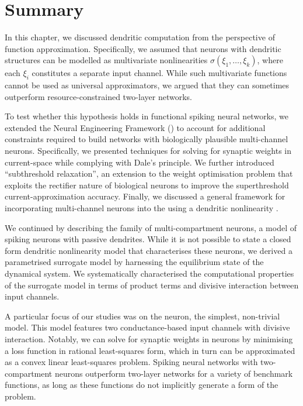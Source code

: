 
\section{Summary}
\label{sec:nlif_discussion}

In this chapter, we discussed dendritic computation from the perspective of function approximation.
Specifically, we assumed that neurons with dendritic structures can be modelled as multivariate nonlinearities $\sigma(\xi_1, \ldots, \xi_k)$, where each $\xi_i$ constitutes a separate input channel.
While such multivariate functions cannot be used as universal approximators, we argued that they can sometimes outperform resource-constrained two-layer networks.

To test whether this hypothesis holds in functional spiking neural networks, we extended the Neural Engineering Framework (\NEF) to account for additional constraints required to build networks with biologically plausible multi-channel neurons.
Specifically, we presented techniques for solving for synaptic weights in current-space while complying with Dale's principle.
We further introduced \enquote{subthreshold relaxation}, an extension to the weight optimisation problem that exploits the rectifier nature of biological neurons to improve the superthreshold current-approximation accuracy.
Finally, we discussed a general framework for incorporating multi-channel neurons into the \NEF using a dendritic nonlinearity \Hden.

We continued by describing the \nlif family of multi-compartment neurons, a model of spiking neurons with passive dendrites.
While it is not possible to state a closed form dendritic nonlinearity model \Hden that characterises these neurons, we derived a parametrised surrogate model by harnessing the equilibrium state of the \nlif dynamical system.
We systematically characterised the computational properties of the surrogate model in terms of product terms and divisive interaction between input channels.

A particular focus of our studies was on the \twocomplif neuron, the simplest, non-trivial \nlif model.
This model features two conductance-based input channels with divisive interaction.
Notably, we can solve for synaptic weights in \twocomplif neurons by minimising a loss function in rational least-squares form, which in turn can be approximated as a convex linear least-squares problem.
Spiking neural networks with two-compartment neurons outperform two-layer networks for a variety of benchmark functions, as long as these functions do not implicitly generate a form of the \XOR problem.

